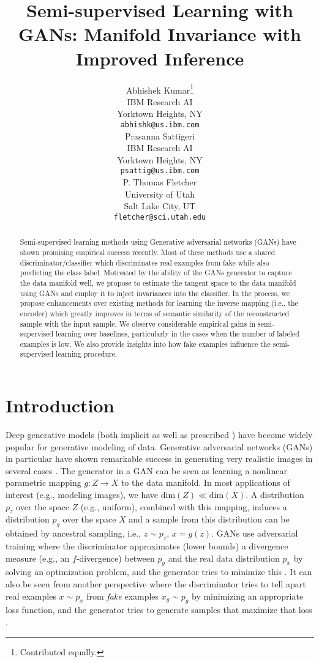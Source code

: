 \documentclass{article}
\title{Semi-supervised Learning with GANs:  Manifold Invariance with Improved Inference}
\author{
  Abhishek Kumar\thanks{Contributed equally.} \\
  IBM Research AI\\
  Yorktown Heights, NY\\
  \texttt{abhishk@us.ibm.com} \\
  \And
  Prasanna Sattigeri\footnotemark[1]  \\
  IBM Research AI\\
  Yorktown Heights, NY\\
  \texttt{psattig@us.ibm.com} \\
  \And
  P. Thomas Fletcher \\
  University of Utah\\
  Salt Lake City, UT\\
  \texttt{fletcher@sci.utah.edu} \\
}
\begin{document}
\maketitle

\begin{abstract}
Semi-supervised learning methods using Generative adversarial networks (GANs) have shown promising empirical success recently. Most of these methods use a shared discriminator/classifier which discriminates real examples from fake while also predicting the class label. Motivated by the ability of the GANs generator to capture the data manifold well, we propose to estimate the tangent space to the data manifold using GANs and employ it to inject invariances into the classifier. In the process, we propose enhancements over existing methods for learning the inverse mapping (i.e., the encoder)  which greatly improves in terms of semantic similarity of the reconstructed sample with the input sample. We observe considerable empirical gains in semi-supervised learning over baselines, particularly in the cases when the number of labeled examples is low. We also provide insights into how fake examples influence the semi-supervised learning procedure. 
\end{abstract}

\section{Introduction}

Deep generative models (both implicit \cite{goodfellow2014generative,mohamed2016learning} as well as prescribed \cite{kingma2013auto}) have become widely popular for generative modeling of data. Generative adversarial networks (GANs) \cite{goodfellow2014generative} in particular have shown remarkable success in generating very realistic images in several cases \cite{radford2015unsupervised,berthelot2017began}.
The generator in a GAN  can be seen as learning a nonlinear parametric mapping $g: Z \to X$ to the data manifold. 
In most applications of interest (e.g., modeling images), we have $\text{dim}(Z) \ll \text{dim}(X)$. 
A distribution $p_z$ over the space $Z$ (e.g., uniform), combined with this mapping, induces a distribution $p_g$ over the space $X$ and a sample from this distribution can be obtained by ancestral sampling, i.e., $z\sim p_z,\, x = g(z)$.  GANs use adversarial training where the discriminator approximates (lower bounds) a divergence measure (e.g., an $f$-divergence) between $p_g$ and the real data distribution $p_x$ by solving an optimization problem, and the generator tries to minimize this \cite{nowozin2016f,goodfellow2014generative}. It can also be seen from another perspective where the discriminator tries to tell apart real examples $x\sim p_x$ from \emph{fake} examples $x_g\sim p_g$ by minimizing an appropriate loss function\cite[Ch.\ 14.2.4]{friedman2001elements}\cite{menon2016linking}, and the generator tries to generate samples that maximize that loss \cite{tu2007learning,goodfellow2014generative}. 
\end{document}
